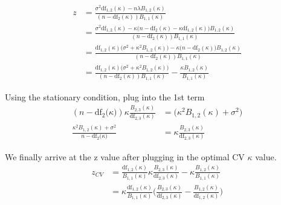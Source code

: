 \begin{align*}
z & =\frac{\sigma^{2}\mathrm{df}_{1,2}(\kappa)-n\lambda B_{1,2}(\kappa)}{(n-\mathrm{df}_{2}(\kappa))B_{1,1}(\kappa)}\\
 & =\frac{\sigma^{2}\mathrm{df}_{1,2}(\kappa)-\kappa\big(n-\mathrm{df}_{2}(\kappa)-\kappa\mathrm{df}_{1,2}(\kappa)\big)B_{1,2}(\kappa)}{(n-\mathrm{df}_{2}(\kappa))B_{1,1}(\kappa)}\\
 & =\frac{\mathrm{df}_{1,2}(\kappa)\big(\sigma^{2}+\kappa^{2}B_{1,2}(\kappa)\big)-\kappa\big(n-\mathrm{df}_{2}(\kappa)\big)B_{1,2}(\kappa)}{(n-\mathrm{df}_{2}(\kappa))B_{1,1}(\kappa)}\\
 & =\frac{\mathrm{df}_{1,2}(\kappa)\big(\sigma^{2}+\kappa^{2}B_{1,2}(\kappa)\big)}{(n-\mathrm{df}_{2}(\kappa))B_{1,1}(\kappa)}-\frac{\kappa B_{1,2}(\kappa)}{B_{1,1}(\kappa)}
\end{align*}

Using the stationary condition, plug into the 1st term
\begin{align*}
(n-\mathrm{df}_{2}\bigl(\kappa\bigr))\kappa\frac{B_{2,3}(\kappa)}{\mathrm{df}_{2,3}(\kappa)} & =\big(\kappa^{2}B_{1,2}(\kappa)+\sigma^{2}\big)\\
\frac{\kappa^{2}B_{1,2}(\kappa)+\sigma^{2}}{n-\mathrm{df}_{2}\bigl(\kappa\bigr)} & =\kappa\frac{B_{2,3}(\kappa)}{\mathrm{df}_{2,3}(\kappa)}
\end{align*}

We finally arrive at the z value after plugging in the optimal CV
$\kappa$ value.
\begin{align*}
z_{CV} & =\frac{\mathrm{df}_{1,2}(\kappa)}{B_{1,1}(\kappa)}\kappa\frac{B_{2,3}(\kappa)}{\mathrm{df}_{2,3}(\kappa)}-\kappa\frac{B_{1,2}(\kappa)}{B_{1,1}(\kappa)}\\
 & =\kappa\frac{\mathrm{df}_{1,2}(\kappa)}{B_{1,1}(\kappa)}\Big(\frac{B_{2,3}(\kappa)}{\mathrm{df}_{2,3}(\kappa)}-\frac{B_{1,2}(\kappa)}{\mathrm{df}_{1,2}(\kappa)}\Big)
\end{align*}

\noindent{}

